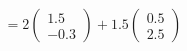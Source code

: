 \documentclass[preview]{standalone}
\begin{document}
\begin{align*}
= 2 \begin{pmatrix} 1.5 \\ -0.3 \end{pmatrix} + 1.5 \begin{pmatrix} 0.5 \\ 2.5 \end{pmatrix}
\end{align*}
\end{document}
